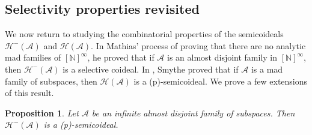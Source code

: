 \documentclass[11pt,reqno]{amsart}
\theoremstyle{plain}
\numberwithin{equation}{section}
\newtheorem{proposition}[theorem]{Proposition}
\theoremstyle{definition}
\newcommand{\N}{\mathbb{N}}
\newcommand{\cal}{\mathcal}
\newcommand{\A}{\cal{A}}
\renewcommand{\H}{\cal{H}}
\begin{document}
\subsection{Selectivity properties revisited}
We now return to studying the combinatorial properties of the semicoideals $\H^-(\A)$ and $\H(\A)$. In Mathias' process of proving that there are no analytic mad families of $[\N]^\infty$, he proved that if $\A$ is an almost disjoint family in $[\N]^\infty$, then $\H^-(\A)$ is a selective coideal. In \cite{S19}, Smythe proved that if $\A$ is a mad family of subspaces, then $\H(\A)$ is a (p)-semicoideal. We prove a few extensions of this result. 

\begin{proposition}
\label{prop:H^-(A).is.(p)}
    Let $\A$ be an infinite almost disjoint family of subspaces. Then $\H^-(\A)$ is a (p)-semicoideal.
\end{proposition}
\end{document}
